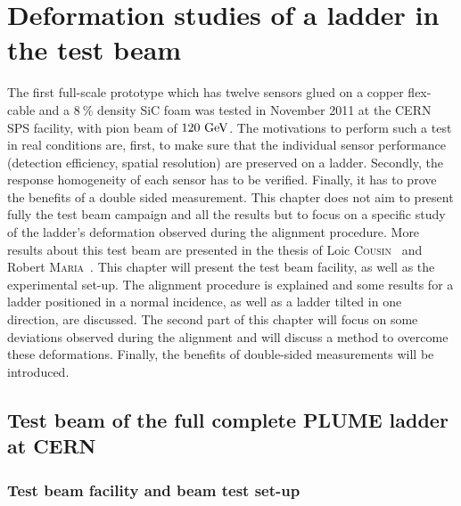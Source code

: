 \chapter{Deformation studies of a ladder in the test beam}
\label{chap:deformation}

  The first full-scale prototype which has twelve sensors glued on a copper flex-cable and a $8~\%$ density \gls{SiC} foam was tested in November 2011 at the \gls{CERN} \gls{SPS} facility, with pion beam of $120~\rm{GeV}$.
  The motivations to perform such a test in real conditions are, first, to make sure that the individual sensor performance (detection efficiency, spatial resolution) are preserved on a ladder.
  Secondly, the response homogeneity of each sensor has to be verified.
  Finally, it has to prove the benefits of a double sided measurement.
  This chapter does not aim to present fully the test beam campaign and all the results but to focus on a specific study of the ladder's deformation observed during the alignment procedure.
  More results about this test beam are presented in the thesis of Loic \textsc{Cousin}~\cite{cousin} and Robert \textsc{Maria}~\cite{maria}.
  This chapter will present the test beam facility, as well as the experimental set-up.
  The alignment procedure is explained and some results for a ladder positioned in a normal incidence, as well as a ladder tilted in one direction, are discussed.
  The second part of this chapter will focus on some deviations observed during the alignment and will discuss a method to overcome these deformations.
  Finally, the benefits of double-sided measurements will be introduced.
  
  \minitoc

  \section{Test beam of the full complete PLUME ladder at CERN}

    \subsection{Test beam facility and beam test set-up}

